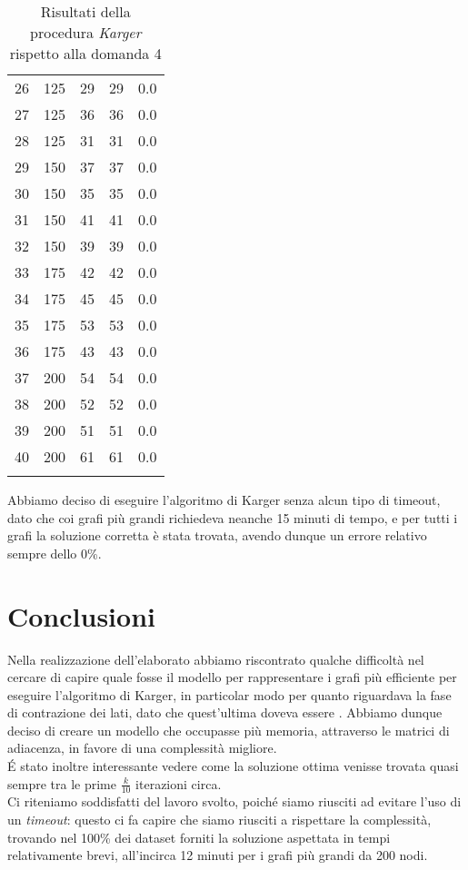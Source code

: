 \begin{center}
\begin{longtable}{|c|c|c|c|c|}
		26 & 125 & 29 & 29 & 0.0 \\
		27 & 125 & 36 & 36 & 0.0 \\
		28 & 125 & 31 & 31 & 0.0 \\
		29 & 150 & 37 & 37 & 0.0 \\
		30 & 150 & 35 & 35 & 0.0 \\
		31 & 150 & 41 & 41 & 0.0 \\
		32 & 150 & 39 & 39 & 0.0 \\
		33 & 175 & 42 & 42 & 0.0 \\
		34 & 175 & 45 & 45 & 0.0 \\
		35 & 175 & 53 & 53 & 0.0 \\
		36 & 175 & 43 & 43 & 0.0 \\
		37 & 200 & 54 & 54 & 0.0 \\
		38 & 200 & 52 & 52 & 0.0 \\
		39 & 200 & 51 & 51 & 0.0 \\
		40 & 200 & 61 & 61 & 0.0 \\
		\hline
		\caption{Risultati della procedura \textit{Karger} rispetto alla domanda 4}
		\label{error-results}
	\end{longtable}
\end{center}\vspace{-40pt}

Abbiamo deciso di eseguire l'algoritmo di Karger senza alcun tipo di timeout, dato che coi grafi più grandi richiedeva neanche 15 minuti di tempo, e per tutti i grafi la soluzione corretta è stata trovata, avendo dunque un errore relativo sempre dello 0\%.

\section{Conclusioni}
Nella realizzazione dell'elaborato abbiamo riscontrato qualche difficoltà nel cercare di capire quale fosse il modello per rappresentare i grafi più efficiente per eseguire l'algoritmo di Karger, in particolar modo per quanto riguardava la fase di contrazione dei lati, dato che quest'ultima doveva essere . Abbiamo dunque deciso di creare un modello che occupasse più memoria, attraverso le matrici di adiacenza, in favore di una complessità migliore.\\
\'E stato inoltre interessante vedere come la soluzione ottima venisse trovata quasi sempre tra le prime $\frac{k}{10}$ iterazioni circa.\\
Ci riteniamo soddisfatti del lavoro svolto, poiché siamo riusciti ad evitare l'uso di un \textit{timeout}: questo ci fa capire che siamo riusciti a rispettare la complessità, trovando nel 100\% dei dataset forniti la soluzione aspettata in tempi relativamente brevi, all'incirca 12 minuti per i grafi più grandi da 200 nodi.